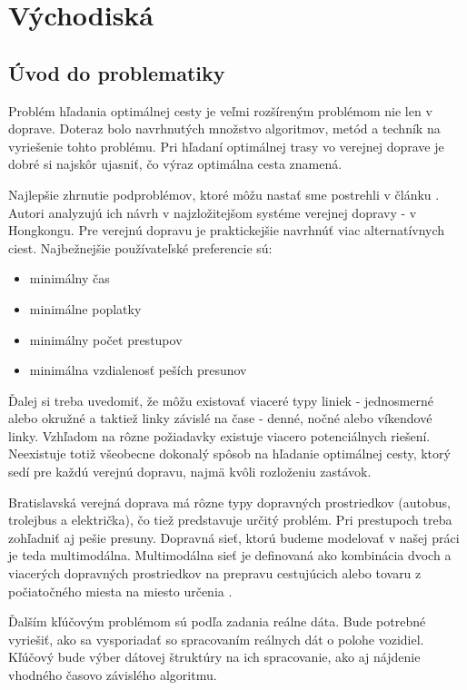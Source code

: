\chapter{Východiská}
\label{kap:vyc} %

\section{Úvod do problematiky}
\label{sec:intro}
Problém hľadania optimálnej cesty je veľmi rozšíreným problémom nie len v doprave. Doteraz bolo navrhnutých množstvo algoritmov, metód a techník na vyriešenie tohto problému. Pri hľadaní optimálnej trasy vo verejnej doprave je dobré si najskôr ujasniť, čo  výraz optimálna cesta znamená.

Najlepšie zhrnutie podproblémov, ktoré môžu nastať sme postrehli v článku \cite{circular}. 
Autori analyzujú ich návrh v najzložitejšom systéme verejnej dopravy - v Hongkongu. Pre verejnú dopravu je praktickejšie navrhnúť viac alternatívnych ciest. Najbežnejšie používateľské preferencie sú:
\begin{itemize}
\setlength\itemsep{-0.3em}
\item{minimálny čas}
\item{minimálne poplatky}
\item{minimálny počet prestupov}
\item{minimálna vzdialenosť peších presunov}
\end{itemize}
Ďalej si treba uvedomiť, že môžu existovať viaceré typy liniek - jednosmerné alebo okružné a taktiež linky závislé na čase - denné, nočné alebo víkendové linky. Vzhľadom na rôzne požiadavky existuje viacero potenciálnych riešení. Neexistuje totiž všeobecne dokonalý spôsob na hľadanie optimálnej cesty, ktorý sedí pre každú verejnú dopravu, najmä kvôli rozloženiu zastávok.

Bratislavská verejná doprava má rôzne typy dopravných prostriedkov (autobus, trolejbus a električka), čo tiež predstavuje určitý problém. Pri prestupoch treba zohľadniť aj pešie presuny. Dopravná sieť, ktorú budeme modelovať v našej práci je teda multimodálna. Multimodálna sieť je definovaná ako kombinácia dvoch a viacerých dopravných prostriedkov na prepravu cestujúcich alebo tovaru z počiatočného miesta na miesto určenia \cite{timedependent}.

Ďalším kľúčovým problémom sú podľa zadania reálne dáta. Bude potrebné vyriešiť, ako sa vysporiadať so spracovaním reálnych dát o polohe vozidiel. Kľúčový bude výber dátovej štruktúry na ich spracovanie, ako aj nájdenie vhodného časovo závislého algoritmu.

